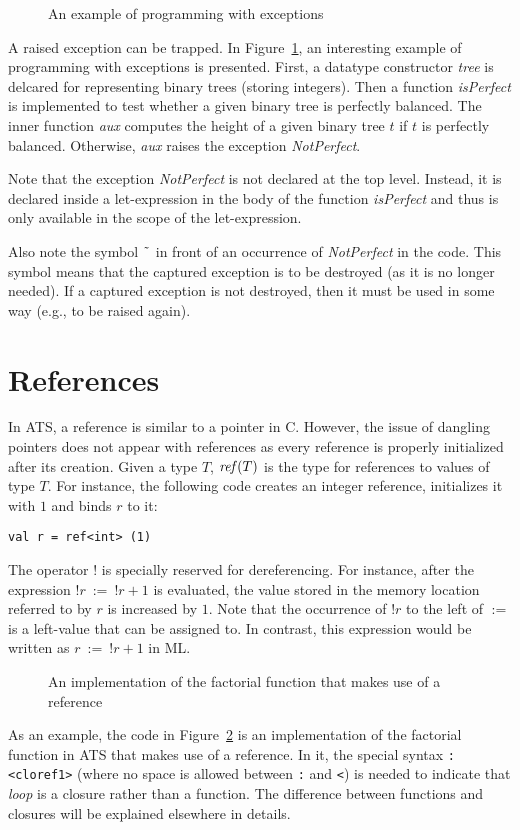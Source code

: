 \begin{figure}[thp]

\caption{An example of programming with exceptions}
\label{figure:isPerfect}
\end{figure}
A raised exception can be trapped.  In Figure~\ref{figure:isPerfect}, an
interesting example of programming with exceptions is presented. First, a
datatype constructor {\it tree} is delcared for representing binary trees
(storing integers). Then a function {\it isPerfect} is implemented to test
whether a given binary tree is perfectly balanced.  The inner function {\it
aux} computes the height of a given binary tree $t$ if $t$ is perfectly
balanced. Otherwise, {\it aux} raises the exception {\it NotPerfect}.

Note that the exception {\it NotPerfect} is not declared at the top
level. Instead, it is declared inside a let-expression in the body of the
function {\it isPerfect} and thus is only available in the scope of the
let-expression.

Also note the symbol $\char126$ in front of an occurrence of {\it
NotPerfect} in the code.  This symbol means that the captured exception is
to be destroyed (as it is no longer needed). If a captured exception is not
destroyed, then it must be used in some way (e.g., to be raised again).

\section{References}
In ATS, a reference is similar to a pointer in C. However, the issue of
dangling pointers does not appear with references as every reference is
properly initialized after its creation.  Given a type $T$, ${\it ref}(T)$ is
the type for references to values of type $T$. For instance, the following
code creates an integer reference, initializes it with $1$ and binds $r$ to
it:
\begin{verbatim}
val r = ref<int> (1)
\end{verbatim}
The operator $!$ is specially reserved for dereferencing.  For
instance, after the expression $!r~:=~!r + 1$ is evaluated, the value
stored in the memory location referred to by $r$ is increased by $1$. Note
that the occurrence of $!r$ to the left of $:=$ is a left-value that can be
assigned to.  In contrast, this expression would be written as $r~:=~!r +
1$ in ML.

\begin{figure}[thp]

\caption{An implementation of the factorial function that makes use of a reference}
\label{figure:fact_function_ref.dats}
\end{figure}
As an example, the code in Figure~\ref{figure:fact_function_ref.dats} is an
implementation of the factorial function in ATS that makes use of a
reference. In it, the special syntax \verb`:<cloref1>` (where no space is
allowed between \verb`:` and \verb`<`) is needed to indicate that {\it
loop} is a closure rather than a function.  The difference between
functions and closures will be explained elsewhere in details.

